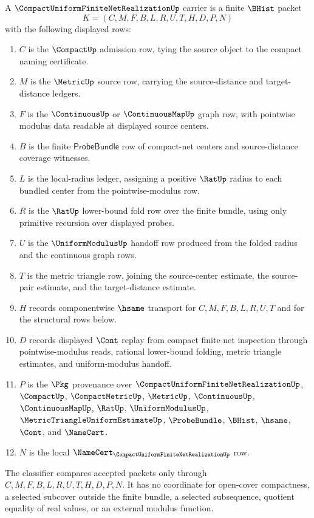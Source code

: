 \begin{definition}
\label{def:compact-uniform-vision-finite-net-realization}
A $\CompactUniformFiniteNetRealizationUp$ carrier is a finite $\BHist$ packet
$$
K=(C,M,F,B,L,R,U,T,H,D,P,N)
$$
with the following displayed rows:
\begin{enumerate}
\item $C$ is the $\CompactUp$ admission row, tying the source object to the compact naming certificate.
\item $M$ is the $\MetricUp$ source row, carrying the source-distance and target-distance ledgers.
\item $F$ is the $\ContinuousUp$ or $\ContinuousMapUp$ graph row, with pointwise modulus data readable at displayed source centers.
\item $B$ is the finite $\mathsf{ProbeBundle}$ row of compact-net centers and source-distance coverage witnesses.
\item $L$ is the local-radius ledger, assigning a positive $\RatUp$ radius to each bundled center from the pointwise-modulus row.
\item $R$ is the $\RatUp$ lower-bound fold row over the finite bundle, using only primitive recursion over displayed probes.
\item $U$ is the $\UniformModulusUp$ handoff row produced from the folded radius and the continuous graph rows.
\item $T$ is the metric triangle row, joining the source-center estimate, the source-pair estimate, and the target-distance estimate.
\item $H$ records componentwise $\hsame$ transport for $C,M,F,B,L,R,U,T$ and for the structural rows below.
\item $D$ records displayed $\Cont$ replay from compact finite-net inspection through pointwise-modulus reads, rational lower-bound folding, metric triangle estimates, and uniform-modulus handoff.
\item $P$ is the $\Pkg$ provenance over $\CompactUniformFiniteNetRealizationUp$, $\CompactUp$, $\CompactMetricUp$, $\MetricUp$, $\ContinuousUp$, $\ContinuousMapUp$, $\RatUp$, $\UniformModulusUp$, $\MetricTriangleUniformEstimateUp$, $\ProbeBundle$, $\BHist$, $\hsame$, $\Cont$, and $\NameCert$.
\item $N$ is the local $\NameCert_{\CompactUniformFiniteNetRealizationUp}$ row.
\end{enumerate}
The classifier compares accepted packets only through $C,M,F,B,L,R,U,T,H,D,P,N$. It has no coordinate for open-cover compactness, a selected subcover outside the finite bundle, a selected subsequence, quotient equality of real values, or an external modulus function.
\end{definition}

